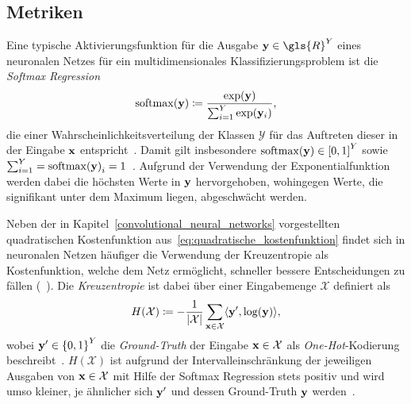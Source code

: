 \subsection{Metriken}
\label{metriken}

Eine typische Aktivierungsfunktion für die Ausgabe $\ve{y} \in \gls{R}^Y$ eines neuronalen Netzes für ein multidimensionales Klassifizierungsproblem ist die \emph{Softmax Regression}
\begin{equation*}
  \mathrm{softmax}\left(\ve{y}\right) \coloneqq \frac{\exp\left(\ve{y}\right)}{\sum_{i=1}^Y \exp\left(\ve{y}_i\right)},
\end{equation*}
die einer Wahrscheinlichkeitsverteilung der Klassen $\mathcal{Y}$ für das Auftreten dieser in der Eingabe $\mathbf{x}$ entspricht~\cite{Nielsen, tensorflow}.
Damit gilt insbesondere $\mathrm{softmax}\left(\ve{y}\right) \in {\left[0, 1\right]}^Y$ sowie $\sum_{i=1}^Y = {\mathrm{softmax}\left(\ve{y}\right)}_i = 1$~\cite{Nielsen}.
Aufgrund der Verwendung der Exponentialfunktion werden dabei die höchsten Werte in $\mathbf{y}$ hervorgehoben, wohingegen Werte, die signifikant unter dem Maximum liegen, abgeschwächt werden.

Neben der in Kapitel~\ref{convolutional_neural_networks} vorgestellten quadratischen Kostenfunktion aus~\eqref{eq:quadratische_kostenfunktion} findet sich in neuronalen Netzen häufiger die Verwendung der Kreuzentropie als Kostenfunktion, welche dem Netz ermöglicht, schneller bessere Entscheidungen zu fällen (\vgl{}~\cite{Nielsen}).
Die \emph{Kreuzentropie} ist dabei über einer Eingabemenge $\mathcal{X}$ definiert als
\begin{equation*}
  H\left(\mathcal{X}\right) \coloneqq - \frac{1}{\left|\mathcal{X}\right|} \sum_{\ve{x} \in \mathcal{X}} \left\langle \ve{y}^{\prime}, \log\left(\ve{y}\right)\right\rangle,
\end{equation*}
wobei $\ve{y}^{\prime} \in {\left\{ 0, 1 \right\}}^Y$ die \emph{Ground-Truth} der Eingabe $\mathbf{x} \in \mathcal{X}$ als \emph{One-Hot}-Kodierung beschreibt~\cite{tensorflow, Nielsen}.
$H\left(\mathcal{X}\right)$ ist aufgrund der Intervalleinschränkung der jeweiligen Ausgaben  von $\mathbf{x} \in \mathcal{X}$ mit Hilfe der Softmax Regression stets positiv und wird umso kleiner, je ähnlicher sich $\mathbf{y}^{\prime}$ und dessen Ground-Truth $\mathbf{y}$ werden~\cite{Nielsen}.

